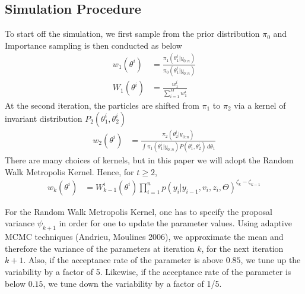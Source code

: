 \documentclass[11pt]{article}
\theoremstyle{definition}
\begin{document}
\subsection{Simulation Procedure}
To start off the simulation, we first sample from the prior distribution $\pi_{0}$ and Importance sampling is then conducted as below
\begin{equation}
	\begin{aligned}
		w_{1}(\theta^{i}) &= \frac{\pi_{1}(\theta_{1}^{i}|y_{0:n})}{\pi_{0}(\theta_{1}^{i}|y_{0:n})} \\
		W_{1}(\theta^{i}) &= \frac{w_{1}^{i}}{\sum_{i=1}^{M} w_{1}^{i}}
	\end{aligned}
\end{equation}
At the second iteration, the particles are shifted from $\pi_{1}$ to $\pi_{2}$ via a kernel of invariant distribution $P_{2}(\theta_{1}^{i},\theta_{2}^{i})$
\begin{equation}
	\begin{aligned}
		w_{2}(\theta^{i}) &= \frac{\pi_{2}(\theta_{2}^{i}|y_{0:n})}{\int \pi_{1}(\theta_{1}^{i}|y_{0:n})P(\theta_{1}^{i},\theta_{2}^{i}) \,d\theta_{1}}
	\end{aligned}
\end{equation}
There are many choices of kernels, but in this paper we will adopt the Random Walk Metropolis Kernel. Hence, for $t\geqslant2$,
\begin{equation}
	\begin{aligned}
		w_{k}(\theta^{i}) &= W_{k-1}^{i}(\theta^{i})\prod_{i=1}^{n} p(y_{i}|y_{i-1},v_{i},z_{i},\Theta)^{\zeta_{k}-\zeta_{k-1}}
	\end{aligned}
\end{equation}

\noindent For the Random Walk Metropolis Kernel, one has to specify the proposal variance $\psi_{k+1}$ in order for one to update the parameter values. Using adaptive MCMC techniques (Andrieu, Moulines 2006), we approximate the mean and therefore the variance of the parameters at iteration $k$, for the next iteration $k+1$. Also, if the acceptance rate of the parameter is above $0.85$, we tune up the variability by a factor of 5. Likewise, if the acceptance rate of the parameter is below $0.15$, we tune down the variability by a factor of 1/5. 
\end{document}
